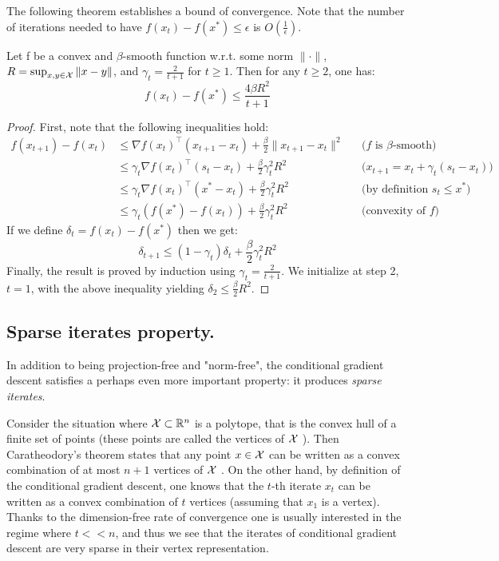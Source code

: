 The following theorem establishes a bound of convergence. Note that the number of iterations needed to have $f(x_t)-f(x^*) \leq \epsilon$  is $O(\frac{1}{\epsilon})$.

\begin{theorem}
Let f be a convex and $\beta$-smooth function w.r.t. some norm $\|\cdot\|$, $R=\sup_{x,y \in \mathcal{X}} \| x-y \|$, and $\gamma_t=\frac{2}{t+1}$ for $t \geq 1$. Then for any $t\geq2$, one has:
\begin{equation}
f(x_t)-f(x^*) \leq \frac{4 \beta R^2 }{t+1}
\end{equation}
\end{theorem}

\begin{proof}
First, note that the following inequalities hold:
  \begin{align}
    f(x_{t+1})-f(x_t) & \leq \nabla f(x_t)^\top (x_{t+1}-x_{t}) + \frac{\beta}{2} \| x_{t+1}-x_{t} \|^2 \nonumber && \text{($f$ is $\beta$-smooth)} \\
    & \leq \gamma_t \nabla f(x_t)^\top (s_{t}-x_{t}) + \frac{\beta}{2} \gamma_t^2 R^2 \nonumber && \text{($x_{t+1}=x_t+\gamma_t (s_t-x_t)$)} \\
    & \leq \gamma_t \nabla f(x_t)^\top (x^*-x_t) + \frac{\beta}{2} \gamma_t^2 R^2 \nonumber && \text{(by definition $s_t \leq x^*$)} \\
    & \leq \gamma_t ( f(x^*)-f(x_t)) + \frac{\beta}{2} \gamma_t^2 R^2 \nonumber && \text{(convexity of $f$)}
  \end{align}
If we define $\delta_t = f(x_t)-f(x^*)$ then we get:
\begin{equation}
\delta_{t+1} \leq (1-\gamma_t)\delta_t+\frac{\beta}{2} \gamma_t^2 R^2
\end{equation}
Finally, the result is proved by induction using $\gamma_t =\frac{2}{t+1}$. We initialize at step 2, $t=1$, with the above inequality yielding $\delta_2 \leq \frac{\beta}{2} R^2$.
\end{proof}

\subsection{Sparse iterates property.}
In addition to being projection-free and "norm-free", the conditional gradient descent satisfies a perhaps even more important property: it produces \emph{sparse iterates}.

Consider the situation where $\mathcal{X} \subset \mathbb{R}^n$ is a polytope, that is the convex hull of a finite set of points (these points are called the vertices of $\mathcal{X}$ ). Then Caratheodory's theorem states that any point $x \in \mathcal{X}$ can be written as a convex combination of at most $n+1$ vertices of $\mathcal{X}$ . On the other hand, by definition of the conditional gradient descent, one knows that the $t$-th iterate $x_t$ can be written as a convex combination of $t$ vertices (assuming that $x_1$ is a vertex). Thanks to the dimension-free rate of convergence one is usually interested in the regime where $t<<n$, and thus we see that the iterates of conditional gradient descent are very sparse in their vertex representation.

